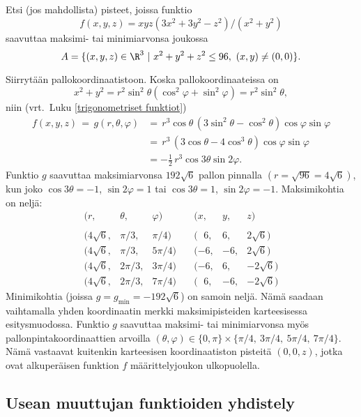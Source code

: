 \begin{Exa}
Etsi (jos mahdollista) pisteet, joissa funktio
\[
f(x,y,z)=xyz(3x^2+3y^2-z^2)/(x^2+y^2)
\]
saavuttaa maksimi- tai minimiarvonsa joukossa
\[
A=\{(x,y,z)\in\R^3 \ | \ x^2+y^2+z^2\leq 96, \ (x,y)\neq (0,0)\}.
\]
\end{Exa}
\ratk Siirrytään pallokoordinaatistoon. Koska pallokoordinaateissa on
\[
x^2+y^2=r^2\sin^2\theta(\cos^2\varphi + \sin^2\varphi)=r^2\sin^2\theta,
\]
niin (vrt.\ Luku \ref{trigonometriset funktiot})
\begin{align*}
f(x,y,z)\,=\,g(r,\theta,\varphi) 
         &=\,r^3\cos\theta\,(3\sin^2\theta-\cos^2\theta)\cos\varphi\sin\varphi \\[2mm]
         &=\,r^3\,(3\cos\theta-4\cos^3\theta)\cos\varphi\sin\varphi \\
         &=-\frac{1}{2}\,r^3\cos 3\theta\sin 2\varphi.
\end{align*}
Funktio $g$ saavuttaa maksimiarvonsa $192\sqrt{6}$ pallon pinnalla $(r=\sqrt{96}=4\sqrt{6})$, 
kun joko $\cos 3\theta=-1$, $\sin 2\varphi=1$ tai $\cos 3\theta=1$, $\sin 2\varphi=-1$. 
Maksimikohtia on neljä:
\[
\begin{array}{llllrr}
(r, & \theta, & \varphi) & (x, & y, & z) \\ \\
(4\sqrt{6}, & \pi/3, & \pi/4) \quad & (\ \: \, 6, &6, &2\sqrt{6}) \\ 
(4\sqrt{6}, & \pi/3, & 5\pi/4) \quad & (-6, &-6, &2\sqrt{6}) \\ 
(4\sqrt{6}, & 2\pi/3, & 3\pi/4) \quad & (-6, & 6, &-2\sqrt{6}) \\ 
(4\sqrt{6}, & 2\pi/3, & 7\pi/4) \quad & (\ \: \, 6, &-6, &-2\sqrt{6})
\end{array}
\]
Minimikohtia (joissa $g=g_{\text{min}}=-192\sqrt{6}$) on samoin neljä. Nämä saadaan vaihtamalla
yhden koordinaatin merkki maksimipisteiden karteesisessa esitysmuodossa. Funktio $g$ saavuttaa
maksimi- tai minimiarvonsa myös pallonpintakoordinaattien arvoilla 
$(\theta,\varphi) \in  \{0,\pi\} \times \{\pi/4,\ 3\pi/4,\ 5\pi/4,\ 7\pi/4\}$. Nämä vastaavat 
kuitenkin karteesisen koordinaatiston pisteitä $(0,0,z)$, jotka ovat alkuperäisen funktion $f$ 
määrittelyjoukon ulkopuolella. \loppu

\subsection{Usean muuttujan funktioiden yhdistely}

